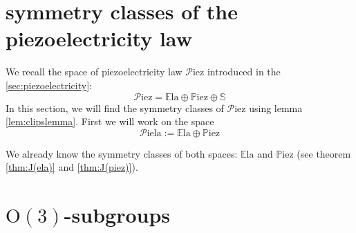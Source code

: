 \documentclass[11pt,a4paper]{amsart}
\theoremstyle{definition}
\newcommand{\Ela}{\mathbb{E}\mathrm{la}}    %
\newcommand{\Piez}{\mathbb{P}\mathrm{iez}}  %
\newcommand{\Sym}{\mathbb{S}}               %
\newcommand{\OO}{\mathrm{O}}                %
\newcommand{\1}{\mathds{1}}		            %
\begin{document}

\section{symmetry classes of the piezoelectricity law}
\par We recall the space of piezoelectricity law $\mathcal{P}$iez introduced in the \autoref{sec:piezoelectricity}:
\begin{equation*}
\mathcal{P}\text{iez}=\Ela \oplus \Piez \oplus \Sym
\end{equation*}
In this section, we will find the symmetry classes of $\mathcal{P}$iez using lemma \ref{lem:clipslemma}. First we will work on the space
\begin{equation*}
\mathcal{P}\text{iela}:=\Ela\oplus \Piez
\end{equation*}

We already know the symmetry classes of both spaces: $\Ela$ and $\Piez$ (see theorem \ref{thm:J(ela)} and \ref{thm:J(piez)}).


\newpage
\appendix
\section{$\OO(3)$-subgroups}
\label{sec:appendixA}
\end{document}
